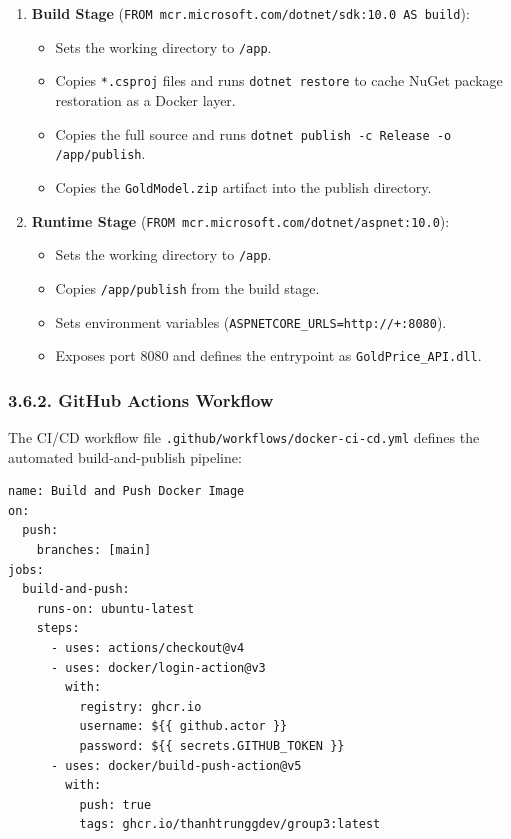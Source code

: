 \begin{enumerate}
  \item \textbf{Build Stage} (\texttt{FROM mcr.microsoft.com/dotnet/sdk:10.0 AS build}):
  \begin{itemize}
    \item Sets the working directory to \texttt{/app}.
    \item Copies \texttt{*.csproj} files and runs \texttt{dotnet restore} to cache NuGet package restoration as a Docker layer.
    \item Copies the full source and runs \texttt{dotnet publish -c Release -o /app/publish}.
    \item Copies the \texttt{GoldModel.zip} artifact into the publish directory.
  \end{itemize}
  \item \textbf{Runtime Stage} (\texttt{FROM mcr.microsoft.com/dotnet/aspnet:10.0}):
  \begin{itemize}
    \item Sets the working directory to \texttt{/app}.
    \item Copies \texttt{/app/publish} from the build stage.
    \item Sets environment variables (\texttt{ASPNETCORE\_URLS=http://+:8080}).
    \item Exposes port 8080 and defines the entrypoint as \texttt{GoldPrice\_API.dll}.
  \end{itemize}
\end{enumerate}

\subsubsection{3.6.2. GitHub Actions Workflow}
The CI/CD workflow file \texttt{.github/workflows/docker-ci-cd.yml} defines the automated build-and-publish pipeline:

\begin{lstlisting}[language={}, numbers=none]
name: Build and Push Docker Image
on:
  push:
    branches: [main]
jobs:
  build-and-push:
    runs-on: ubuntu-latest
    steps:
      - uses: actions/checkout@v4
      - uses: docker/login-action@v3
        with:
          registry: ghcr.io
          username: ${{ github.actor }}
          password: ${{ secrets.GITHUB_TOKEN }}
      - uses: docker/build-push-action@v5
        with:
          push: true
          tags: ghcr.io/thanhtrunggdev/group3:latest
\end{lstlisting}

